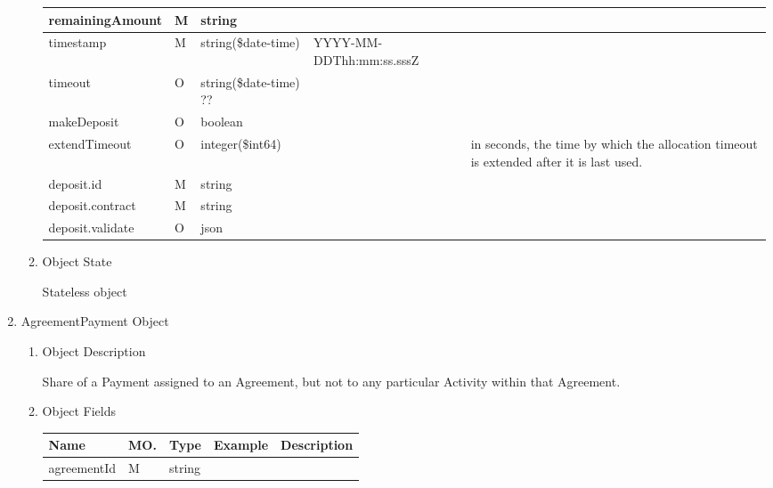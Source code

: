 \begin{enumerate}
\begin{enumerate}
\begin{center}
\begin{tabular}{|p{3cm}|l|p{3cm}|p{3cm}|p{4cm}|}
remainingAmount			& M & string 				&							&  \\
\hline

timestamp 				& M & string(\$date-time) 	&  YYYY-MM-DDThh:mm:ss.sssZ	&  \\
\hline

timeout					& O & string(\$date-time) ?? &							&  \\
\hline

makeDeposit				& O & boolean				&							&  \\
\hline


extendTimeout			& O & integer(\$int64)		&							& 	in seconds, the time by which the allocation timeout is extended 
																					after it is last used. \\
\hline

deposit.id				& M & string 				&							&  \\
\hline

deposit.contract		& M & string 				&							&  \\
\hline

deposit.validate		& O & json					& 							& 	\\
\hline
			
\end{tabular}
\end{center}

\item Object State

Stateless object

\end{enumerate}

\item AgreementPayment Object

\begin{enumerate}

\item Object Description

Share of a Payment assigned to an Agreement, but not to any particular Activity within that Agreement.

\item Object Fields

\begin{center}
\begin{tabular}{|p{3cm}|l|p{3cm}|p{3cm}|p{4cm}|} 
\hline
\rowcolor{lightgray}	Name	& MO.	& Type	& Example & 	Description \\
\hline

agreementId		& M & string				&							& 							\\
\hline


\end{tabular}
\end{center}
\end{enumerate}
\end{enumerate}
